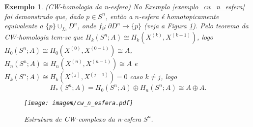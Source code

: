 \documentclass[12pt]{book}
\newtheorem{exemplo}[teorema]{Exemplo}
\newenvironment{prova}[1]{$\square$ #1}{\hfill$\blacksquare$}
\DeclareMathOperator{\Ima}{Im}
\newcommand{\homologia}[2]{H_{#1}(#2;A)}
\newcommand{\homologiarel}[3]{H_{#1}(#2,#3)}
\newcommand{\homologiarelskele}[3]{H_{#1}(X^{(#2)}, X^{(#3)})}
\newcommand{\homologiarelskelesimpl}[2]{H_{#1}(X^{(#2)}, X^{(#2-1)})}
\newcommand{\imagem}[1]{\Ima(#1)}
\newcommand{\skeleton}[1]{X^{(#1)}}
\begin{document}
	
	\begin{exemplo}
		(CW-homologia da n-esfera)
		No Exemplo \ref{exemplo_cw_n_esfera} foi demonstrado que, dado $p \in S^{n} $, então a $n$-esfera é homotopicamente equivalente a $\{p\}\cup_{f_{\partial}}D^{n}$, onde $f_{\partial}: \partial D^{n} \to \{p\}$ (veja a Figura \ref{figura_cw_n_esfera}). Pelo teorema da CW-homologia tem-se que $\homologia{k}{S^{n}} \cong \homologiarelskelesimpl{k}{k}$, logo $\homologia{0}{S^{n}} \cong \homologiarelskelesimpl{0}{0} \cong A$, $\homologia{n}{S^{n}} \cong \homologiarelskelesimpl{n}{n} \cong A$ e $\homologia{k}{S^{n}} \cong \homologiarelskelesimpl{k}{j} =0$ caso $k \neq j$, logo
		$$
		\homologia{*}{S^{n}} = \homologia{0}{S^{n}}\oplus\homologia{n}{S^{n}} \cong A \oplus A.
		$$
		\begin{figure}[!h]
			\centering
			\texttt{[image: imagem/cw\_n\_esfera.pdf]}
			\caption{Estrutura de CW-complexo da n-esfera $S^{n}$.}
			\label{figura_cw_n_esfera}
		\end{figure} 
	\end{exemplo}
	
\end{document}
